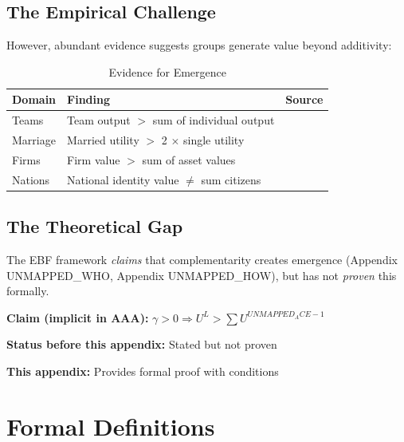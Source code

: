 \subsection{The Empirical Challenge}

However, abundant evidence suggests groups generate value beyond additivity:

\begin{table}[htbp]
\centering
\caption{Evidence for Emergence}
\label{tab:emergence-evidence}
\renewcommand{\arraystretch}{1.3}
\begin{tabular}{@{}lll@{}}
\toprule
\textbf{Domain} & \textbf{Finding} & \textbf{Source} \\
\midrule
Teams & Team output $>$ sum of individual output & \citet{woolley2010} \\
Marriage & Married utility $>$ 2 $\times$ single utility & \citet{stutzer2006} \\
Firms & Firm value $>$ sum of asset values & \citet{milgromroberts1995} \\
Nations & National identity value $\neq$ sum citizens & \citet{akerlof2000} \\
\bottomrule
\end{tabular}
\end{table}

\subsection{The Theoretical Gap}

The EBF framework \textit{claims} that complementarity creates emergence
(Appendix UNMAPPED_WHO, Appendix UNMAPPED_HOW), but has not \textit{proven} this formally.

\begin{tcolorbox}[colback=red!5!white, colframe=red!75!black,
    title=The Gap We Fill]
\textbf{Claim (implicit in AAA):} $\gamma > 0 \Rightarrow U^L > \sum U^{UNMAPPED_ACE-1}$

\textbf{Status before this appendix:} Stated but not proven

\textbf{This appendix:} Provides formal proof with conditions
\end{tcolorbox}


\section{Formal Definitions}
\label{sec:let-definitions}

